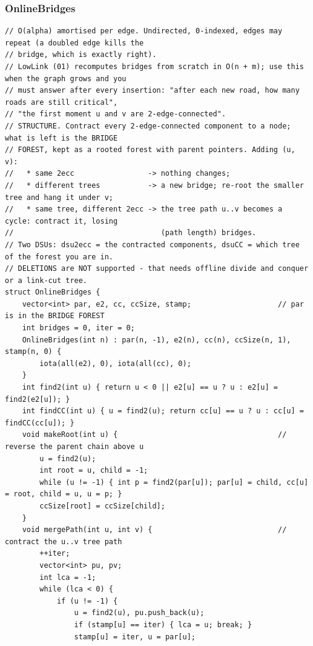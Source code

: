 \documentclass[9pt,a4paper,twocolumn]{extarticle}
\begin{document}
\subsubsection{OnlineBridges}
\nopagebreak
\begin{lstlisting}
// O(alpha) amortised per edge. Undirected, 0-indexed, edges may repeat (a doubled edge kills the
// bridge, which is exactly right).
// LowLink (01) recomputes bridges from scratch in O(n + m); use this when the graph grows and you
// must answer after every insertion: "after each new road, how many roads are still critical",
// "the first moment u and v are 2-edge-connected".
// STRUCTURE. Contract every 2-edge-connected component to a node; what is left is the BRIDGE
// FOREST, kept as a rooted forest with parent pointers. Adding (u, v):
//   * same 2ecc                 -> nothing changes;
//   * different trees           -> a new bridge; re-root the smaller tree and hang it under v;
//   * same tree, different 2ecc -> the tree path u..v becomes a cycle: contract it, losing
//                                  (path length) bridges.
// Two DSUs: dsu2ecc = the contracted components, dsuCC = which tree of the forest you are in.
// DELETIONS are NOT supported - that needs offline divide and conquer or a link-cut tree.
struct OnlineBridges {
    vector<int> par, e2, cc, ccSize, stamp;                    // par is in the BRIDGE FOREST
    int bridges = 0, iter = 0;
    OnlineBridges(int n) : par(n, -1), e2(n), cc(n), ccSize(n, 1), stamp(n, 0) {
        iota(all(e2), 0), iota(all(cc), 0);
    }
    int find2(int u) { return u < 0 || e2[u] == u ? u : e2[u] = find2(e2[u]); }
    int findCC(int u) { u = find2(u); return cc[u] == u ? u : cc[u] = findCC(cc[u]); }
    void makeRoot(int u) {                                     // reverse the parent chain above u
        u = find2(u);
        int root = u, child = -1;
        while (u != -1) { int p = find2(par[u]); par[u] = child, cc[u] = root, child = u, u = p; }
        ccSize[root] = ccSize[child];
    }
    void mergePath(int u, int v) {                             // contract the u..v tree path
        ++iter;
        vector<int> pu, pv;
        int lca = -1;
        while (lca < 0) {
            if (u != -1) {
                u = find2(u), pu.push_back(u);
                if (stamp[u] == iter) { lca = u; break; }
                stamp[u] = iter, u = par[u];

\end{lstlisting}
\end{document}
